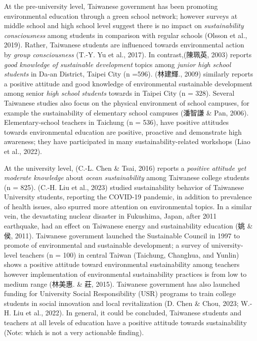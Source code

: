 \documentclass[
  12pt,
  letterpaper,
  DIV=11,
  numbers=noendperiod]{scrartcl}
\begin{document}
\let\pandoctableshortcapt\relax

At the pre-university level, Taiwanese government has been promoting
environmental education through a green school network; however surveys
at middle school and high school level suggest there is no impact on
\emph{sustainability consciousness} among students in comparison with
regular schools (Olsson et al., 2019). Rather, Taiwanese students are
influenced towards environmental action by \emph{group consciousness}
(T.-Y. Yu et al., 2017). In contrast,(陳珮英, 2003) reports \emph{good
knowledge of sustainable development} topics among \emph{junior high
school students} in Da-an District, Taipei City (n =596). (林建輝.,
2009) similarly reports a positive attitude and good knowledge of
environmental sustainable development among senior \emph{high school
students} towards in Taipei City (n = 328). Several Taiwanese studies
also focus on the physical environment of school campuses, for example
the sustainability of elementary school campuses (潘智謙 \& Pan, 2006).
Elementary-school teachers in Taichung (n = 536), have positive
attitudes towards environmental education are positive, proactive and
demonstrate high awareness; they have participated in many
sustainability-related workshops (Liao et al., 2022).

At the university level, (C.-L. Chen \& Tsai, 2016) reports a
\emph{positive attitude yet moderate knowledge} about \emph{ocean
sustainability} among Taiwanese college students (n = 825). (C.-H. Liu
et al., 2023) studied sustainability behavior of Taiwanese University
students, reporting the COVID-19 pandemic, in addition to prevalence of
health issues, also spurred more attention on environmental topics. In a
similar vein, the devastating nuclear disaster in Fukushima, Japan,
after 2011 earthquake, had an effect on Taiwanese energy and
sustainability education (姚 \& 侯, 2011). Taiwanese government launched
the Sustainable Council in 1997 to promote of environmental and
sustainable development; a survey of university-level teachers (n = 100)
in central Taiwan (Taichung, Changhua, and Yunlin) shows a positive
attitude toward environmental sustainability among teachers however
implementation of environmental sustainability practices is from low to
medium range (林美惠. \& 莊, 2015). Taiwanese government has also
launched funding for University Social Responsibility (USR) programs to
train college students in social innovation and local revitalization (D.
Chen \& Chou, 2023; W.-H. Liu et al., 2022). In general, it could be
concluded, Taiwanese students and teachers at all levels of education
have a positive attitude towards sustainability (Note: which is not a
very actionable finding).
\end{document}
